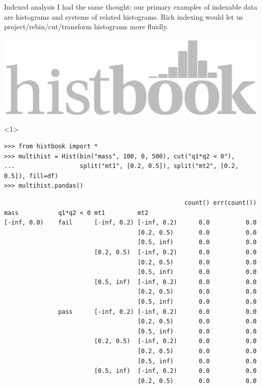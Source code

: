 \documentclass[aspectratio=169]{beamer}
\begin{document}
\begin{frame}[fragile]{Indexed analysis}
\large
\vspace{0.25 cm}
I had the same thought: our primary examples of indexable data are histograms and systems of related histograms. Rich indexing would let us project/rebin/cut/transform histograms more fluidly.

\vspace{-0.5 cm}
\hfill \includegraphics[height=1 cm]{histbook-logo.pdf}

\vspace{-0.5 cm}
\vspace{0.25 cm}
\begin{onlyenv}<1>
\scriptsize
\begin{verbatim}
>>> from histbook import *
>>> multihist = Hist(bin("mass", 100, 0, 500), cut("q1*q2 < 0"),
...                  split("mt1", [0.2, 0.5]), split("mt2", [0.2, 0.5]), fill=df)
>>> multihist.pandas()
\end{verbatim}
\tiny
\vspace{-0.25 cm}
\begin{verbatim}
                                                  count() err(count())
mass           q1*q2 < 0 mt1         mt2
[-inf, 0.0)    fail      [-inf, 0.2) [-inf, 0.2)      0.0          0.0
                                     [0.2, 0.5)       0.0          0.0
                                     [0.5, inf)       0.0          0.0
                         [0.2, 0.5)  [-inf, 0.2)      0.0          0.0
                                     [0.2, 0.5)       0.0          0.0
                                     [0.5, inf)       0.0          0.0
                         [0.5, inf)  [-inf, 0.2)      0.0          0.0
                                     [0.2, 0.5)       0.0          0.0
                                     [0.5, inf)       0.0          0.0
               pass      [-inf, 0.2) [-inf, 0.2)      0.0          0.0
                                     [0.2, 0.5)       0.0          0.0
                                     [0.5, inf)       0.0          0.0
                         [0.2, 0.5)  [-inf, 0.2)      0.0          0.0
                                     [0.2, 0.5)       0.0          0.0
                                     [0.5, inf)       0.0          0.0
                         [0.5, inf)  [-inf, 0.2)      0.0          0.0
                                     [0.2, 0.5)       0.0          0.0

\end{verbatim}
\end{onlyenv}
\end{frame}
\end{document}
